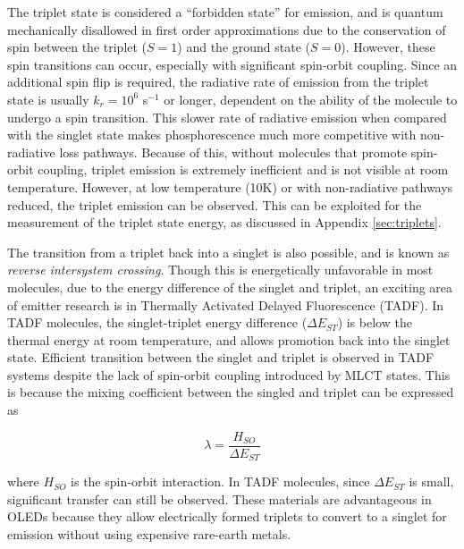 \documentclass[../thesis.tex]{subfiles}
\begin{document}
The triplet state is considered a ``forbidden state'' for emission, and is quantum mechanically disallowed in first order approximations due to the conservation of spin between the triplet ($S=1$) and the ground state ($S=0$).
However, these spin transitions can occur, especially with significant spin-orbit coupling.
Since an additional spin flip is required, the radiative rate of emission from the triplet state is usually $k_r=10^6$ s$^{-1}$ or longer, dependent on the ability of the molecule to undergo a spin transition.
This slower rate of radiative emission when compared with the singlet state makes phosphorescence much more competitive with non-radiative loss pathways.
Because of this, without molecules that promote spin-orbit coupling, triplet emission is extremely inefficient and is not visible at room temperature.
However, at low temperature (10K)\supercite{Holmes2003,Turro1991a,Goushi2004d,Frankfurt1989,Padhye1956} or with non-radiative pathways reduced,\supercite{Reineke2014} the triplet emission can be observed.
This can be exploited for the measurement of the triplet state energy, as discussed in Appendix \ref{sec:triplets}.


The transition from a triplet back into a singlet is also possible, and is known as \textit{reverse intersystem crossing}.\supercite{Chan2018,Lee2016,Inoue2016,Zhang2014a,Mehes2014,Zhang2012c,Endo2009,Li2013,Nakanotani2013,Nasu2013}
Though this is energetically unfavorable in most molecules, due to the energy difference of the singlet and triplet, an exciting area of emitter research is in Thermally Activated Delayed Fluorescence (TADF).
In TADF molecules, the singlet-triplet energy difference ($\Delta E_{ST}$) is below the thermal energy at room temperature, and allows promotion back into the singlet state.
Efficient transition between the singlet and triplet is observed in TADF systems despite the lack of spin-orbit coupling introduced by MLCT states.  
This is because the mixing coefficient between the singled and triplet can be expressed as\supercite{Uoyama2012}

\begin{equation}
\lambda=\frac{H_{SO}}{\Delta E_{ST}}
\end{equation}

where $H_{SO}$ is the spin-orbit interaction.  
In TADF molecules, since $\Delta E_{ST}$ is small, significant transfer can still be observed.
These materials are advantageous in OLEDs because they allow electrically formed triplets to convert to a singlet for emission without using expensive rare-earth metals.
\end{document}
